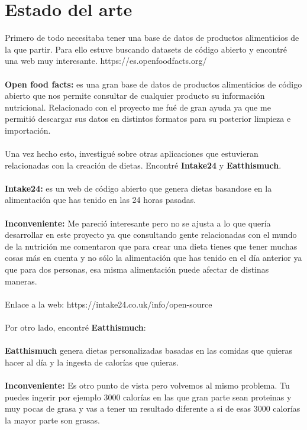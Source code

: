 \chapter{Estado del arte}

Primero de todo necesitaba tener una base de datos de productos alimenticios de la que partir. Para ello estuve buscando datasets de código abierto y encontré una web muy interesante.
https://es.openfoodfacts.org/
\\\\
\textbf{Open food facts:} es una gran base de datos de productos alimenticios de código abierto que nos permite consultar de cualquier producto su información nutricional.
Relacionado con el proyecto me fué de gran ayuda ya que me permitió descargar sus datos en distintos formatos para su posterior limpieza e importación.
\\\\
Una vez hecho esto, investigué sobre otras aplicaciones que estuvieran relacionadas con la creación de dietas. Encontré \textbf{Intake24} y \textbf{Eatthismuch}. 
\\\\
\textbf{Intake24:} es un web de código abierto que genera dietas basandose en la alimentación que has tenido en las 24 horas pasadas.
\\\\
\textbf{Inconveniente:}
Me pareció interesante pero no se ajusta a lo que quería desarrollar en este proyecto ya que consultando gente relacionadas
con el mundo de la nutrición me comentaron que para crear una dieta tienes que tener muchas cosas más en cuenta y no sólo
la alimentación que has tenido en el día anterior ya que para dos personas, esa misma alimentación puede afectar de distinas maneras.
\\\\
Enlace a la web: https://intake24.co.uk/info/open-source
\\\\
Por otro lado, encontré \textbf{Eatthismuch}:
\\\\
\textbf{Eatthismuch} genera dietas personalizadas basadas en las comidas que quieras hacer al día y la ingesta de calorías que quieras.
\\\\
\textbf{Inconveniente:}
Es otro punto de vista pero volvemos al mismo problema. Tu puedes ingerir por ejemplo 3000 calorías en las que gran parte sean proteinas
y muy pocas de grasa y vas a tener un resultado diferente a si de esas 3000 calorías la mayor parte son grasas.
